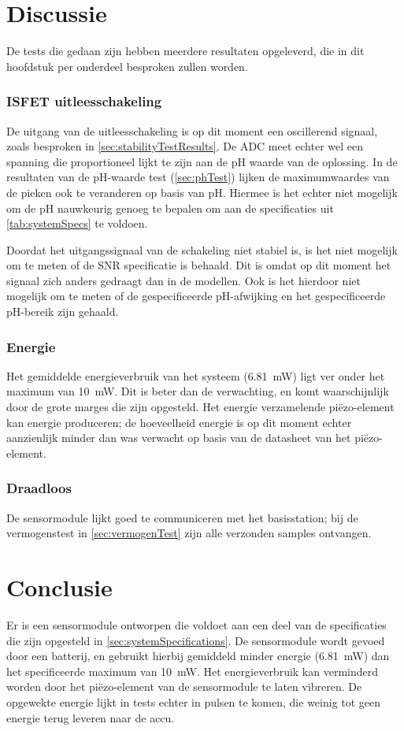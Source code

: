 \section{Discussie}
De tests die gedaan zijn hebben meerdere resultaten opgeleverd, die in dit hoofdstuk per onderdeel besproken zullen worden.

\subsubsection*{ISFET uitleesschakeling}
De uitgang van de uitleesschakeling is op dit moment een oscillerend signaal, zoals besproken in \cref{sec:stabilityTestResults}. De ADC meet echter wel een spanning die proportioneel lijkt te zijn aan de pH waarde van de oplossing.
In de resultaten van de pH-waarde test (\cref{sec:phTest}) lijken de maximumwaardes van de pieken ook te veranderen op basis van pH. Hiermee is het echter niet mogelijk om de pH nauwkeurig genoeg te bepalen om aan de specificaties uit \cref{tab:systemSpecs} te voldoen.

Doordat het uitgangssignaal van de schakeling niet stabiel is, is het niet mogelijk om te meten of de SNR specificatie is behaald. Dit is omdat op dit moment het signaal zich anders gedraagt dan in de modellen.
Ook is het hierdoor niet mogelijk om te meten of de gespecificeerde pH-afwijking en het gespecificeerde pH-bereik zijn gehaald.

\subsubsection*{Energie}
Het gemiddelde energieverbruik van het systeem (\qty{6.81}{\milli\watt}) ligt ver onder het maximum van \qty{10}{\milli\watt}. Dit is beter dan de verwachting, en komt waarschijnlijk door de grote marges die zijn opgesteld.
Het energie verzamelende piëzo-element kan energie produceren; de hoeveelheid energie is op dit moment echter aanzienlijk minder dan was verwacht op basis van de datasheet van het piëzo-element.

\subsubsection*{Draadloos}
De sensormodule lijkt goed te communiceren met het basisstation; bij de vermogenstest in \cref{sec:vermogenTest} zijn alle verzonden samples ontvangen.


\newpage
\section{Conclusie}
Er is een sensormodule ontworpen die voldoet aan een deel van de specificaties die zijn opgesteld in \cref{sec:systemSpecifications}. De sensormodule wordt gevoed door een batterij, en gebruikt hierbij gemiddeld minder energie (\qty{6.81}{\milli\watt}) dan het specificeerde maximum van \qty{10}{\milli\watt}. Het energieverbruik kan verminderd worden door het piëzo-element van de sensormodule te laten vibreren. De opgewekte energie lijkt in tests echter in pulsen te komen, die weinig tot geen energie terug leveren naar de accu.

